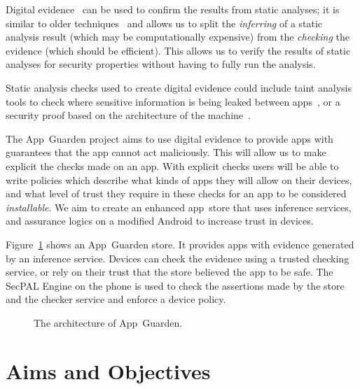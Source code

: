 \documentclass[]{llncs}
\begin{document}
Digital evidence~\cite{Stark:2009uc} can be used to confirm the results from
static analyses; it is similar to older techniques~\cite{Necula:1996tr} and
allows us to split the \emph{inferring} of a static analysis result (which may
be computationally expensive) from the \emph{checking} the evidence (which
should be efficient).  This allows us to verify the results of static analyses
for security properties without having to fully run the analysis.

Static analysis checks used to create digital evidence could include taint
analysis tools to check where sensitive information is being leaked between
apps~\cite{Enck:2010uw}, or a security proof based on the architecture of the
machine~\cite{Barthe:2007bd}.  

The App~Guarden project aims to use digital evidence to provide apps with
guarantees that the app cannot act maliciously.  This will allow us to make
explicit the checks made on an app.  With explicit checks users will be able to
write policies which describe what kinds of apps they will allow on their
devices, and what level of trust they require in these checks for an app to be
considered \emph{installable}.  We aim to create an enhanced app~store that
uses inference services, and assurance logics on a modified Android to increase
trust in devices. 

Figure~\ref{fig:architecture} shows an App~Guarden store. It provides apps with
evidence generated by an inference service.  Devices can check the evidence
using a trusted checking service, or rely on their trust that the store
believed the app to be safe.  The SecPAL Engine on the phone is used to check
the assertions made by the store and the checker service and enforce a device
policy.

\begin{figure}[h]
  \centering
  \def\svgwidth{0.57\textwidth}
  \scriptsize\sf
  
  \caption{The architecture of App~Guarden.}\label{fig:architecture}
\end{figure}

\section{Aims and Objectives}
\end{document}
